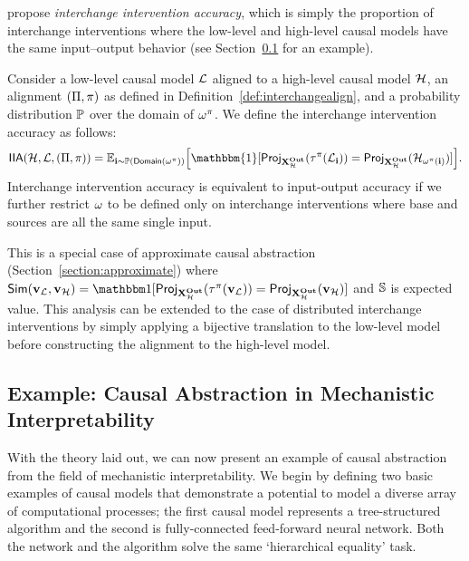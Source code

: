 \documentclass[twoside,11pt]{article}
\begin{document}
\cite{geiger-etal-2021-iit} propose \textit{interchange intervention accuracy}, which is simply the proportion of interchange interventions where the low-level and high-level causal models have the same input--output behavior (see Section~\ref{sec:example} for an example).
\begin{definition}\label{def:IIA}
Consider a low-level causal model $\mathcal{L}$ aligned to a high-level causal model $\mathcal{H}$, an alignment $(\Pi, \pi)$ as defined in Definition~\ref{def:interchangealign}, and a probability distribution $\mathbb{P}$ over the domain of $\omega^{\pi}$. We define the interchange intervention accuracy as follows:
 \[\mathsf{IIA}(\highmodel, \lowmodel, (\cellpart, \cellfunc)) = \mathbb{E}_{\mathbf{i} \sim \distribution(\dom(\intmap^{\cellfunc}))}\Big[  \mathbbm{1}[\project{\setmap^{\cellfunc}(\lowmodel_{\mathbf{i}})}{\outputvars_{\highmodel}} = \project{\highmodel_{\intmap^{\cellfunc}(\mathbf{i})}}{ \outputvars_{\highmodel}}] \Big].\]
 Interchange intervention accuracy is equivalent to input-output accuracy if we further restrict $\omega$ to be defined only on interchange interventions where base and sources are all the same single input. 
\end{definition}
This is a special case of approximate causal abstraction (Section~\ref{section:approximate}) where $\simfunc(\tset_{\lowmodel}, \tset_{\highmodel}) = \indicator{\project{\setmap^{\cellfunc}(\tset_{\lowmodel})}{\outputvars_{\highmodel}} = \project{\tset_{\highmodel}}{\outputvars_{\highmodel}}}$ and $\mathbb{S}$ is expected value.
This analysis can be extended to the case of distributed interchange interventions by simply applying a bijective translation to the low-level model before constructing the alignment to the high-level model.

\subsection{Example: Causal Abstraction in Mechanistic Interpretability}\label{sec:example}
With the theory laid out, we can now present an example of causal abstraction from the field of mechanistic interpretability. We begin by defining two basic examples of causal models that demonstrate a potential to model a diverse array of computational processes; the first causal model represents a tree-structured algorithm and the second is fully-connected feed-forward neural network. Both the network and the algorithm solve the same `hierarchical equality' task. 
\end{document}
